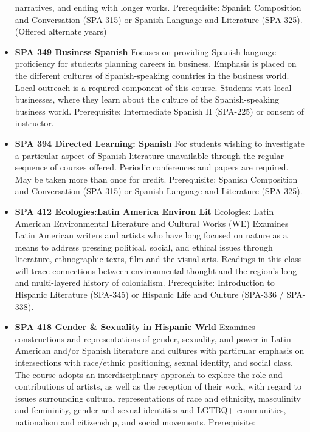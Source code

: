 \documentclass[
  letterpaper,
]{scrbook}
\begin{document}
\begin{itemize}
  narratives, and ending with longer works. Prerequisite: Spanish
  Composition and Conversation (SPA-315) or Spanish Language and
  Literature (SPA-325). (Offered alternate years)\\
\item
  \textbf{SPA 349 Business Spanish} Focuses on providing Spanish
  language proficiency for students planning careers in business.
  Emphasis is placed on the different cultures of Spanish-speaking
  countries in the business world. Local outreach is a required
  component of this course. Students visit local businesses, where they
  learn about the culture of the Spanish-speaking business world.
  Prerequisite: Intermediate Spanish II (SPA-225) or consent of
  instructor.
\item
  \textbf{SPA 394 Directed Learning: Spanish} For students wishing to
  investigate a particular aspect of Spanish literature unavailable
  through the regular sequence of courses offered. Periodic conferences
  and papers are required. May be taken more than once for credit.
  Prerequisite: Spanish Composition and Conversation (SPA-315) or
  Spanish Language and Literature (SPA-325).\\
\item
  \textbf{SPA 412 Ecologies:Latin America Environ Lit} Ecologies: Latin
  American Environmental Literature and Cultural Works (WE) Examines
  Latin American writers and artists who have long focused on nature as
  a means to address pressing political, social, and ethical issues
  through literature, ethnographic texts, film and the visual arts.
  Readings in this class will trace connections between environmental
  thought and the region's long and multi-layered history of
  colonialism. Prerequisite: Introduction to Hispanic Literature
  (SPA-345) or Hispanic Life and Culture (SPA-336 / SPA-338).
\item
  \textbf{SPA 418 Gender \& Sexuality in Hispanic Wrld} Examines
  constructions and representations of gender, sexuality, and power in
  Latin American and/or Spanish literature and cultures with particular
  emphasis on intersections with race/ethnic positioning, sexual
  identity, and social class. The course adopts an interdisciplinary
  approach to explore the role and contributions of artists, as well as
  the reception of their work, with regard to issues surrounding
  cultural representations of race and ethnicity, masculinity and
  femininity, gender and sexual identities and LGTBQ+ communities,
  nationalism and citizenship, and social movements. Prerequisite:

\end{itemize}
\end{document}
